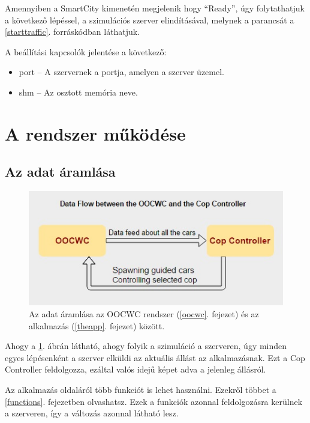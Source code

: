 \documentclass[a4paper,12pt]{report}
\begin{document}
\vspace{2mm}
Amennyiben a SmartCity kimenetén megjelenik hogy ``Ready'', úgy folytathatjuk a következő lépéssel, a szimulációs szerver elindításával, melynek a parancsát a \ref{starttraffic}. forráskódban láthatjuk.



A beállítási kapcsolók jelentése a következő:

\begin{itemize}
\item port -- A szervernek a portja, amelyen a szerver üzemel.
\item shm -- Az osztott memória neve.
\end{itemize}

\section{A rendszer működése}

\subsection{Az adat áramlása}
\label{dataflow}

\begin{figure}[ht]
\centerline{
\includegraphics[width=4.5in]{img/dataflow}}
\caption{Az adat áramlása az OOCWC rendszer (\ref{oocwc}. fejezet) és az alkalmazás (\ref{theapp}. fejezet) között.}
\label{dataflowpicture}
\end{figure}

Ahogy a \ref{dataflowpicture}. ábrán látható, ahogy folyik a szimuláció a szerveren, úgy minden egyes lépésenként a szerver elküldi az aktuális állást az alkalmazásnak. Ezt a Cop Controller feldolgozza, ezáltal valós idejű képet adva a jelenleg állásról.

\vspace{2mm}
Az alkalmazás oldaláról több funkciót is lehet használni. Ezekről többet a \ref{functions}. fejezetben olvashatsz. Ezek a funkciók azonnal feldolgozásra kerülnek a szerveren, így a változás azonnal látható lesz.
\end{document}
